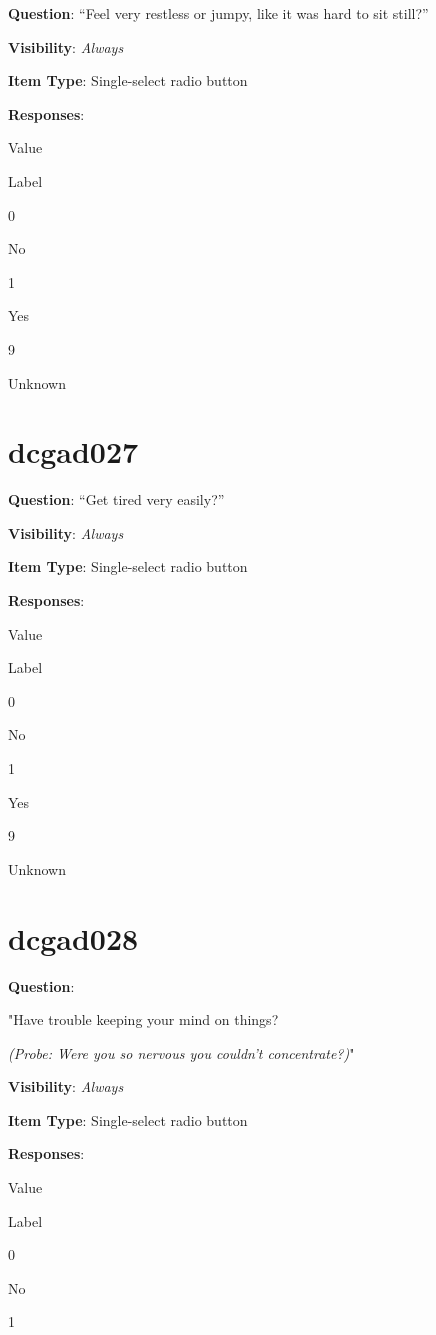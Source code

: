 \documentclass[]{book}
\begin{document}
\textbf{Question}: ``Feel very restless or jumpy, like it was hard to sit still?''

\textbf{Visibility}: \emph{Always}

\textbf{Item Type}: Single-select radio button

\textbf{Responses}:

Value

Label

0

No

1

Yes

9

Unknown

\hypertarget{dcgad027}{%
\section{dcgad027}\label{dcgad027}}

\textbf{Question}: ``Get tired very easily?''

\textbf{Visibility}: \emph{Always}

\textbf{Item Type}: Single-select radio button

\textbf{Responses}:

Value

Label

0

No

1

Yes

9

Unknown

\hypertarget{dcgad028}{%
\section{dcgad028}\label{dcgad028}}

\textbf{Question}:

"Have trouble keeping your mind on things?

\emph{(Probe: Were you so nervous you couldn't concentrate?)}"

\textbf{Visibility}: \emph{Always}

\textbf{Item Type}: Single-select radio button

\textbf{Responses}:

Value

Label

0

No

1
\end{document}
